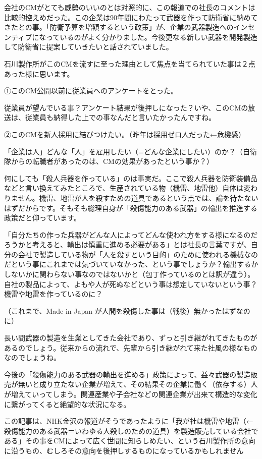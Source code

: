 会社のCMがとても威勢のいいのとは対照的に、この報道での社長のコメントは比較的控えめだった。この企業は90年間にわたって武器を作って防衛省に納めてきたとの事。「防衛予算を増額するという政策」が、企業の武器製造へのインセンティブになっているのがよく分かりました。今後更なる新しい武器を開発製造して防衛省に提案していきたいと話されていました。

石川製作所がこのCMを流すに至った理由として焦点を当てられていた事は２点あった様に思います。

①このCM公開以前に従業員へのアンケートをとった。

従業員が望んでいる事？アンケート結果が後押しになった？いや、このCMの放送は、従業員も納得した上での事なんだと言いたかったんですね。

②このCMを新人採用に結びつけたい。（昨年は採用ゼロ人だった←危機感）

「企業は人」どんな「人」を雇用したい（=どんな企業にしたい）のか？（自衛隊からの転職者があったのは、CMの効果があったという事か？）

何にしても「殺人兵器を作っている」のは事実だ。ここで殺人兵器を防衛装備品などと言い換えてみたところで、生産されている物（機雷、地雷他）自体は変わりません。機雷、地雷が人を殺すための道具であるという点では、論を待たないはずだからです。そもそも総理自身が「殺傷能力のある武器」の輸出を推進する政策だと仰っています。

「自分たちの作った兵器がどんな人によってどんな使われ方をする様になるのだろうかと考えると、輸出は慎重に進める必要がある」とは社長の言葉ですが、自分の会社で製造している物が「人を殺すという目的」のために使われる機械なのだという事にこれまでは気づいていなかった、という事でしょうか？輸出するかしないかに関わらない事なのではないかと（包丁作っているのとは訳が違う）。自社の製品によって、よもや人が死ぬなどという事は想定していないという事？機雷や地雷を作っているのに？

（これまで、Made in Japan が人間を殺傷した事は（戦後）無かったはずなのに）

長い間武器の製造を生業としてきた会社であり、ずっと引き継がれてきたものがあるのでしょう。従来からの流れで、先輩から引き継がれて来た社風の様なものなのでしょうね。

今後の「殺傷能力のある武器の輸出を進める」政策によって、益々武器の製造販売が無いと成り立たない企業が増えて、その結果その企業に働く（依存する）人が増えていってしまう。関連産業や子会社などの関連企業が出来て構造的な変化に繋がってくると絶望的な状況になる。

この記事は、NHK金沢の報道がそうであったように「我が社は機雷や地雷（←殺傷能力のある武器＝いわゆる人殺しのための道具）を製造販売している会社である」その事をCMによって広く世間に知らしめたい、という石川製作所の意向に沿うもの、むしろその意向を後押しするものになっているかもしれません

